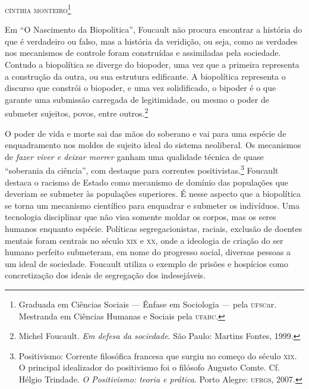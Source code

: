 

\begin{flushright}
\textsc{cínthia monteiro\footnote{Graduada em Ciências Sociais --- Ênfase em Sociologia --- pela \textsc{ufsc}ar. Mestranda em Ciências Humanas e Sociais pela \textsc{ufabc}.}}
\end{flushright}

\noindent{}Em ``O Nascimento da Biopolitica'', Foucault não procura
encontrar a história do que é verdadeiro ou falso, mas a história da
veridição, ou seja, como as verdades nos mecanismos de controle foram
construídas e assimiladas pela sociedade. Contudo a biopolítica se
diverge do biopoder, uma vez que a primeira representa a construção da
outra, ou sua estrutura edificante. A biopolítica representa o discurso
que constrói o biopoder, e uma vez solidificado, o bipoder é o que
garante uma submissão carregada de legitimidade, ou mesmo o poder de
submeter sujeitos, povos, entre outros.\footnote{Michel Foucault. \emph{Em defesa da sociedade}. São Paulo: Martins Fontes, 1999.}

O poder de vida e morte sai das mãos do soberano e vai para uma espécie
de enquadramento nos moldes de sujeito ideal do sistema neoliberal. Os
mecanismos de \emph{fazer viver e deixar morrer} ganham uma qualidade
técnica de quase ``soberania da ciência'', com destaque para correntes
positivistas.\footnote{Positivismo: Corrente filosófica francesa que
  surgiu no começo do século \textsc{xix}. O principal idealizador do positivismo
  foi o filósofo Augusto Comte. Cf. Hélgio Trindade. \emph{O Positivismo: teoria e prática}. Porto Alegre: \textsc{ufrgs}, 2007.} Foucault destaca o
racismo de Estado como mecanismo de domínio das populações que deveriam
se submeter às populações superiores. É nesse aspecto que a biopolítica
se torna um mecanismo científico para enquadrar e submeter os
indivíduos. Uma tecnologia disciplinar que não visa somente moldar os
corpos, mas os seres humanos enquanto espécie. Políticas
segregacionistas, raciais, exclusão de doentes mentais foram centrais no
século \textsc{xix} e \textsc{xx}, onde a ideologia de criação do ser humano perfeito
submeteram, em nome do progresso social, diversas pessoas a um
ideal de sociedade. Foucault utiliza o exemplo de prisões e hospícios
como concretização dos ideais de segregação dos indesejáveis.

